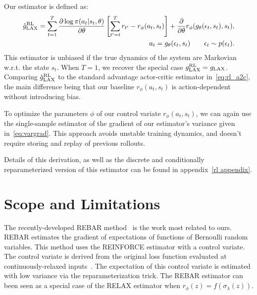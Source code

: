 \documentclass{article}
\newcommand{\LL}[1]{\frac{\partial \log \pi(a_{#1}| s_{#1}, \theta)}{\partial \theta}}
\newcommand{\YW}[1]{{\color{red} \bf [[YW: #1]]}}
\newcommand{\LAX}{{\textnormal{LAX}}}
\newcommand{\RL}{{\textnormal{RL}}}
\begin{document}
Our estimator is defined as: 
%
\begin{align}
\hat g_\LAX^{\RL} = \sum_{t=1}^T \LL{t} \left[ \sum_{t'=t}^T r_{t'} - r_\phi(a_t,s_t) \right] +\frac{\partial}{\partial\theta} r_\phi(g_\theta(\epsilon_t,s_t), s_t), \\
a_t = g_\theta(\epsilon_t,s_t) \qquad \epsilon_t \sim p(\epsilon_t)\nonumber.
\label{eq:rl_est}
\end{align}
%
This estimator is unbiased if the true dynamics of the system are Markovian w.r.t. the state $s_t$.
When $T = 1$, we recover the special case ${g_\LAX^{\RL} = g_\LAX}$.
Comparing $\hat g_\LAX^{\RL}$ to the standard advantage actor-critic estimator in~\eqref{eq:rl_a2c}, the main difference being that our baseline $r_\phi(a_t, s_t)$ is action-dependent without introducing bias.

To optimize the parameters $\phi$ of our control variate $r_\phi(a_t, s_t)$, we can again use the single-sample estimator of the gradient of our estimator's variance given in~\eqref{eq:vargrad}.
This approach avoids unstable training dynamics, and doesn't require storing and replay of previous rollouts.

Details of this derivation, as well as the discrete and conditionally reparameterized version of this estimator can be found in appendix~\ref{rl appendix}.

\section{Scope and Limitations}
\label{limitations}
The recently-developed REBAR method~\citep{tucker2017rebar} is the work most related to ours.
REBAR estimates the gradient of expectations of functions of Bernoulli random variables.
This method uses the REINFORCE estimator with a control variate.
The control variate is derived from the original loss function evaluated at continuously-relaxed inputs~\citep{maddison2016concrete, jang2016categorical}.
The expectation of this control variate is estimated with low variance via the reparameterization trick.
The REBAR estimator can been seen as a special case of the RELAX estimator when ${r_\phi(z) = f(\sigma_\lambda(z))}$.
\end{document}
